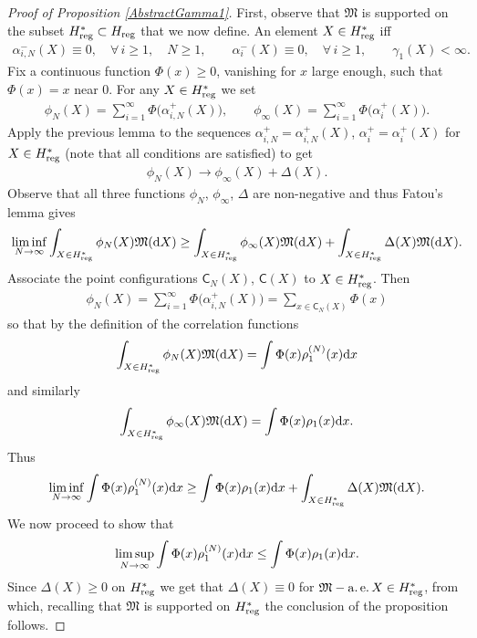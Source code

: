 \begin{proof}[Proof of Proposition \ref{AbstractGamma1}]
First, observe that $\mathfrak{M}$ is supported on the subset $H^{*}_{{\rm reg}}\subset H_{{\rm reg}}$ that we now define. An element $X \in H^*_{{\rm reg}}$ iff
\begin{gather*}
\alpha_{i,N}^-(X)\equiv 0, \quad \forall\, i\ge 1, \quad N\ge 1, \qquad \alpha_i^-(X) \equiv 0, \quad \forall\, i \ge 1, \qquad \gamma_1(X)<\infty.
\end{gather*}
Fix a continuous function $\Phi(x)\ge 0$, vanishing for $x$ large enough, such that $\Phi(x)=x$ near 0. For any $X \in H^{*}_{{\rm reg}}$ we set
\begin{gather*}
\phi_N(X) =\sum_{i=1}^{\infty}\Phi\big(\alpha_{i,N}^+(X)\big),\qquad
\phi_{\infty}(X) =\sum_{i=1}^{\infty}\Phi\big(\alpha_i^+(X)\big).
\end{gather*}
Apply the previous lemma to the sequences $\alpha_{i,N}^+=\alpha_{i,N}^+(X)$, $\alpha_{i}^+=\alpha_{i}^+(X)$ for $X \in H^{*}_{{\rm reg}}$ (note that all conditions are satisfied) to get
\begin{gather*}
\phi_N(X)\to \phi_{\infty}(X)+\Delta(X).
\end{gather*}
Observe that all three functions $\phi_N$, $\phi_{\infty}$, $\Delta$ are non-negative and thus Fatou's lemma gives
\begin{gather*}
\liminf_{N\to \infty} \int_{X \in H^{*}_{{\rm reg}}}^{}\phi_N(X)\mathfrak{M}({\rm d}X) \ge \int_{X \in H^{*}_{{\rm reg}}}^{}\phi_\infty(X)\mathfrak{M}({\rm d}X)+\int_{X \in H^{*}_{{\rm reg}}}^{}\Delta(X)\mathfrak{M}({\rm d}X).
\end{gather*}
Associate the point configurations $\mathsf{C}_N(X)$, $\mathsf{C}(X)$ to $X\in H^{*}_{{\rm reg}}$. Then
\begin{gather*}
\phi_{N}(X)=\sum_{i=1}^{\infty} \Phi\big(\alpha_{i,N}^+(X)\big)=\sum_{x \in \mathsf{C}_N(X)}^{}\Phi(x)
\end{gather*}
so that by the definition of the correlation functions
\begin{gather*}
\int_{X \in H^{*}_{{\rm reg}}}^{}\phi_N(X)\mathfrak{M}({\rm d}X)=\int\Phi(x)\rho_1^{(N)}(x){\rm d}x
\end{gather*}
and similarly
\begin{gather*}
\int_{X \in H^{*}_{{\rm reg}}}^{}\phi_\infty(X)\mathfrak{M}({\rm d}X)= \int \Phi(x)\rho_1(x){\rm d}x.
\end{gather*}
Thus
\begin{gather*}
\liminf_{N \to \infty}\int\Phi(x)\rho_1^{(N)}(x){\rm d}x \ge \int \Phi(x)\rho_1(x){\rm d}x+\int_{X \in H^{*}_{{\rm reg}}}^{}\Delta(X)\mathfrak{M}({\rm d}X).
\end{gather*}
We now proceed to show that
\begin{gather*}
\limsup_{N \to \infty}\int\Phi(x)\rho_1^{(N)}(x){\rm d}x \le \int \Phi(x)\rho_1(x){\rm d}x.
\end{gather*}
Since $\Delta(X)\ge 0$ on $H^{*}_{{\rm reg}}$ we get that $\Delta(X)\equiv 0$ for $\mathfrak{M}-\operatorname{a.e.} X \in H^*_{{\rm reg}}$, from which, recalling that $\mathfrak{M}$ is supported on $H^*_{{\rm reg}}$ the conclusion of the proposition follows.


\end{proof}
